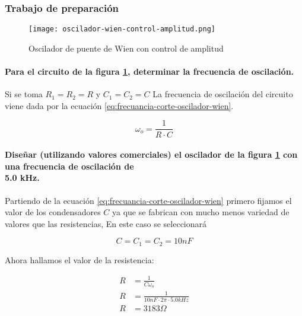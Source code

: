 \subsubsection{Trabajo de preparación}

\begin{figure}[ht]
    \centering
    \texttt{[image: oscilador-wien-control-amplitud.png]}
    \caption{Oscilador de puente de Wien con control de amplitud}
    \label{fig:oscilador-puente-wien-control-de-amplitud}
\end{figure}

\paragraph{Para el circuito de la figura \ref{fig:oscilador-puente-wien-control-de-amplitud}, determinar la frecuencia de oscilación.\\}

Si se toma $R_1 = R_2 = R$ y $C_1 = C_2 = C$ La frecuencia de oscilación del circuito viene dada por la ecuación \ref{eq:frecuancia-corte-oscilador-wien}.

\begin{equation*}
    \omega_o = \frac{1}{R \cdot C} 
\end{equation*}

\paragraph{Diseñar (utilizando valores comerciales) el oscilador de la figura \ref{fig:oscilador-puente-wien-control-de-amplitud} con una frecuencia de oscilación de \\5.0 kHz.\\}

Partiendo de la ecuación \ref{eq:frecuancia-corte-oscilador-wien} primero fijamos el valor de los condensadores $C$ ya que se fabrican con mucho menos variedad de valores que las resistencias, En este caso se seleccionará

\begin{equation}
    \boxed{C = C_1 = C_2 = 10nF}
\end{equation}

Ahora hallamos el valor de la resistencia:

\begin{align}
    R &= \frac{1}{C \omega_o} \\
    R &= \frac{1}{10 nF \cdot 2\pi \cdot 5.0 kHz} \\
    R &= 3183\Omega
\end{align}

